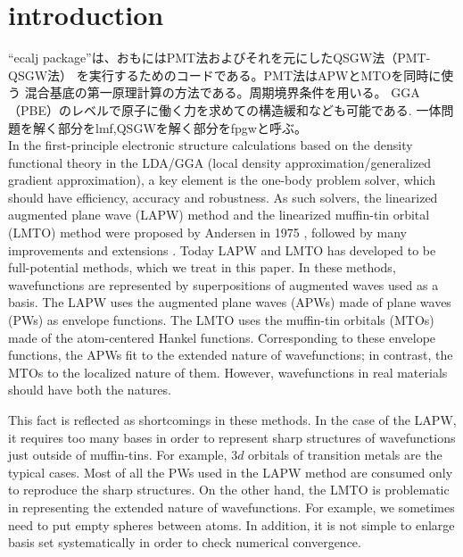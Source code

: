 \documentclass[a4paper,10pt,aip,onecolumn,amsmath,amssymb,floatfix,rmp]{revtex4-1}
\begin{document}
\maketitle
\tableofcontents

\section{introduction}
``ecalj package''は、おもにはPMT法およびそれを元にしたQSGW法（PMT-QSGW法） 
を実行するためのコードである。PMT法はAPWとMTOを同時に使う
混合基底の第一原理計算の方法である。周期境界条件を用いる。
GGA（PBE）のレベルで原子に働く力を求めての構造緩和なども可能である.
一体問題を解く部分をlmf,QSGWを解く部分をfpgwと呼ぶ。\\

In the first-principle electronic structure calculations based on the
density functional theory in the LDA/GGA
(local density approximation/generalized gradient approximation),
a key element is the one-body problem solver, which 
should have efficiency, accuracy and robustness.
As such solvers, the linearized augmented plane wave (LAPW) method and the 
linearized muffin-tin orbital (LMTO) method were proposed by Andersen
in 1975 \cite{Andersen75}, followed by many improvements
and extensions \cite{rmartinbook,Singhbook,bluegel31,lmfchap,PAW,PhysRevB.43.6388}.
Today LAPW and LMTO has developed to be full-potential methods, 
which we treat in this paper.
In these methods, wavefunctions are represented by superpositions of
augmented waves used as a basis. The LAPW uses the augmented plane waves (APWs) made 
of plane waves (PWs) as envelope functions. 
The LMTO uses the muffin-tin orbitals (MTOs) made of the atom-centered 
Hankel functions. Corresponding to these envelope functions, the APWs fit to
the extended nature of wavefunctions; 
in contrast, the MTOs to the localized nature of them.
However, wavefunctions in real materials should have both the natures.

This fact is reflected as shortcomings in these methods.
In the case of the LAPW, it requires too many bases 
in order to represent sharp structures of wavefunctions 
just outside of muffin-tins. For example, 3$d$ orbitals of transition
metals are the typical cases. Most of all the PWs used in the LAPW method 
are consumed only to reproduce the sharp structures.
On the other hand, the LMTO is problematic in representing 
the extended nature of wavefunctions. For example, we sometimes need to 
put empty spheres between atoms. In addition, it is not 
simple to enlarge basis set systematically 
in order to check numerical convergence.
\end{document}
